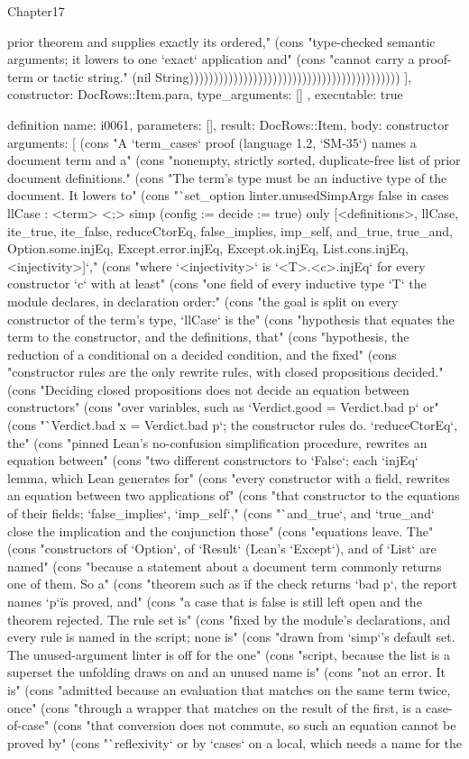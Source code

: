 \begin{lexlean}{Chapter17}
\begin{semanticmodule}
{{prior theorem and supplies exactly its ordered," (cons "type-checked semantic arguments; it lowers to one `exact` application and" (cons "cannot carry a proof-term or tactic string." (nil String)))))))))))))))))))))))))))))))))))))))))))
    ],
    constructor: DocRows::Item.para,
    type_arguments: []
  },
  executable: true
}

definition{
  name: i0061,
  parameters: [],
  result: DocRows::Item,
  body: constructor{
    arguments: [
      (cons "A `term_cases` proof (language 1.2, `SM-35`) names a document term and a" (cons "nonempty, strictly sorted, duplicate-free list of prior document definitions." (cons "The term's type must be an inductive type of the document. It lowers to" (cons "`set_option linter.unusedSimpArgs false in cases llCase : <term> <;> simp (config := {decide := true}) only [<definitions>, llCase, ite_true, ite_false, reduceCtorEq, false_implies, imp_self, and_true, true_and, Option.some.injEq, Except.error.injEq, Except.ok.injEq, List.cons.injEq, <injectivity>]`," (cons "where `<injectivity>` is `<T>.<c>.injEq` for every constructor `c` with at least" (cons "one field of every inductive type `T` the module declares, in declaration order:" (cons "the goal is split on every constructor of the term's type, `llCase` is the" (cons "hypothesis that equates the term to the constructor, and the definitions, that" (cons "hypothesis, the reduction of a conditional on a decided condition, and the fixed" (cons "constructor rules are the only rewrite rules, with closed propositions decided." (cons "Deciding closed propositions does not decide an equation between constructors" (cons "over variables, such as `Verdict.good = Verdict.bad p` or" (cons "`Verdict.bad x = Verdict.bad p`; the constructor rules do. `reduceCtorEq`, the" (cons "pinned Lean's no-confusion simplification procedure, rewrites an equation between" (cons "two different constructors to `False`; each `injEq` lemma, which Lean generates for" (cons "every constructor with a field, rewrites an equation between two applications of" (cons "that constructor to the equations of their fields; `false_implies`, `imp_self`," (cons "`and_true`, and `true_and` close the implication and the conjunction those" (cons "equations leave. The" (cons "constructors of `Option`, of `Result` (Lean's `Except`), and of `List` are named" (cons "because a statement about a document term commonly returns one of them. So a" (cons "theorem such as \"if the check returns `bad p`, the report names `p`\" is proved, and" (cons "a case that is false is still left open and the theorem rejected. The rule set is" (cons "fixed by the module's declarations, and every rule is named in the script; none is" (cons "drawn from `simp`'s default set. The unused-argument linter is off for the one" (cons "script, because the list is a superset the unfolding draws on and an unused name is" (cons "not an error. It is" (cons "admitted because an evaluation that matches on the same term twice, once" (cons "through a wrapper that matches on the result of the first, is a case-of-case" (cons "that conversion does not commute, so such an equation cannot be proved by" (cons "`reflexivity` or by `cases` on a local, which needs a name for the }}
\end{semanticmodule}
\end{lexlean}

